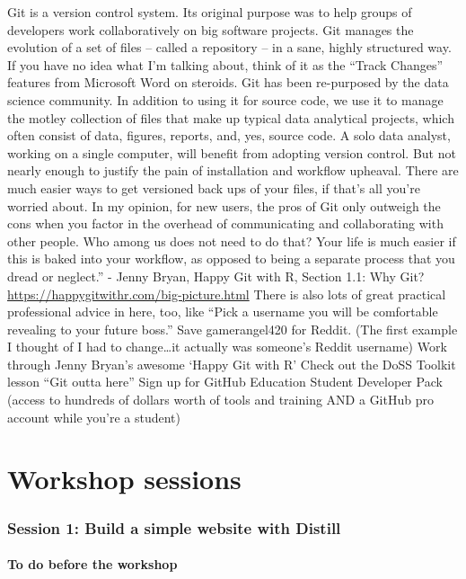 \documentclass[
]{article}
\begin{document}
Git is a version control system. Its original purpose was to help groups of developers work collaboratively on big software projects. Git manages the evolution of a set of files -- called a repository -- in a sane, highly structured way. If you have no idea what I'm talking about, think of it as the ``Track Changes'' features from Microsoft Word on steroids.
Git has been re-purposed by the data science community. In addition to using it for source code, we use it to manage the motley collection of files that make up typical data analytical projects, which often consist of data, figures, reports, and, yes, source code.
A solo data analyst, working on a single computer, will benefit from adopting version control. But not nearly enough to justify the pain of installation and workflow upheaval. There are much easier ways to get versioned back ups of your files, if that's all you're worried about.
In my opinion, for new users, the pros of Git only outweigh the cons when you factor in the overhead of communicating and collaborating with other people. Who among us does not need to do that? Your life is much easier if this is baked into your workflow, as opposed to being a separate process that you dread or neglect.'' - Jenny Bryan, Happy Git with R, Section 1.1: Why Git? \url{https://happygitwithr.com/big-picture.html}
There is also lots of great practical professional advice in here, too, like ``Pick a username you will be comfortable revealing to your future boss.'' Save gamerangel420 for Reddit. (The first example I thought of I had to change\ldots it actually was someone's Reddit username)
Work through Jenny Bryan's awesome `Happy Git with R'
Check out the DoSS Toolkit lesson ``Git outta here''
Sign up for GitHub Education Student Developer Pack (access to hundreds of dollars worth of tools and training AND a GitHub pro account while you're a student)

\hypertarget{part-workshop-sessions}{%
\part{Workshop sessions}\label{part-workshop-sessions}}

\hypertarget{session-1-build-a-simple-website-with-distill}{%
\section{Session 1: Build a simple website with Distill}\label{session-1-build-a-simple-website-with-distill}}

\hypertarget{s1pre}{%
\subsection{To do before the workshop}\label{s1pre}}
\end{document}
